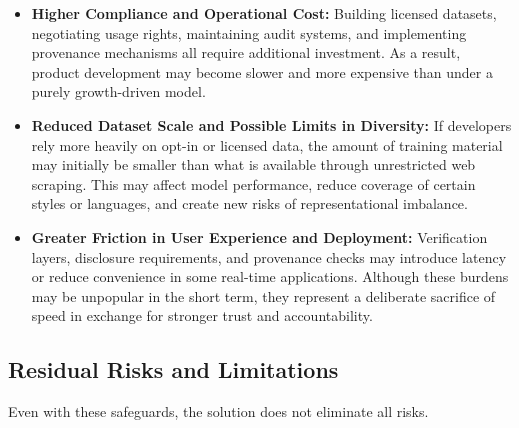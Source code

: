 \begin{itemize}
    \item \textbf{Higher Compliance and Operational Cost:} Building licensed datasets, negotiating usage rights, maintaining audit systems, and implementing provenance mechanisms all require additional investment. As a result, product development may become slower and more expensive than under a purely growth-driven model.

    \item \textbf{Reduced Dataset Scale and Possible Limits in Diversity:} If developers rely more heavily on opt-in or licensed data, the amount of training material may initially be smaller than what is available through unrestricted web scraping. This may affect model performance, reduce coverage of certain styles or languages, and create new risks of representational imbalance.

    \item \textbf{Greater Friction in User Experience and Deployment:} Verification layers, disclosure requirements, and provenance checks may introduce latency or reduce convenience in some real-time applications. Although these burdens may be unpopular in the short term, they represent a deliberate sacrifice of speed in exchange for stronger trust and accountability.
\end{itemize}

\subsection{Residual Risks and Limitations}\label{sec:residual-risks}
Even with these safeguards, the solution does not eliminate all risks.

